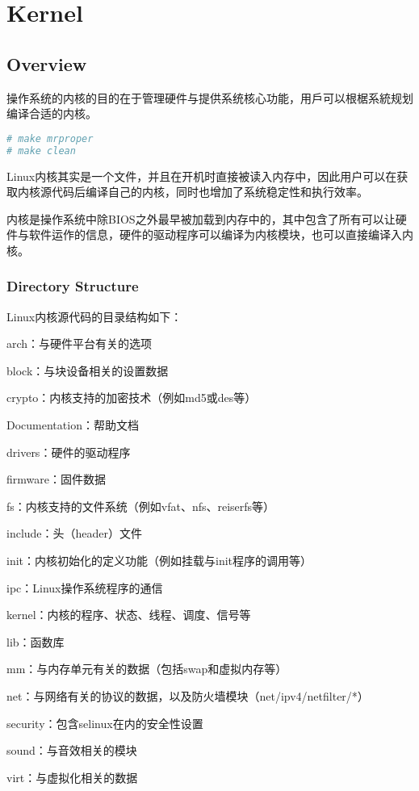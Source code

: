 \part{Kernel}

\chapter{Overview}

操作系统的内核的目的在于管理硬件与提供系统核心功能，用戶可以根椐系統规划编译合适的内核。

\begin{lstlisting}[language=bash]
# make mrproper
# make clean
\end{lstlisting}


Linux内核其实是一个文件，并且在开机时直接被读入内存中，因此用户可以在获取内核源代码后编译自己的内核，同时也增加了系统稳定性和执行效率。

内核是操作系统中除BIOS之外最早被加载到内存中的，其中包含了所有可以让硬件与软件运作的信息，硬件的驱动程序可以编译为内核模块，也可以直接编译入内核。


\section{Directory Structure}


Linux内核源代码的目录结构如下：

\begin{compactitem}
\item arch：与硬件平台有关的选项
\item block：与块设备相关的设置数据
\item crypto：内核支持的加密技术（例如md5或des等）
\item Documentation：帮助文档
\item drivers：硬件的驱动程序
\item firmware：固件数据
\item fs：内核支持的文件系统（例如vfat、nfs、reiserfs等）
\item include：头（header）文件
\item init：内核初始化的定义功能（例如挂载与init程序的调用等）
\item ipc：Linux操作系统程序的通信
\item kernel：内核的程序、状态、线程、调度、信号等
\item lib：函数库
\item mm：与内存单元有关的数据（包括swap和虚拟内存等）
\item net：与网络有关的协议的数据，以及防火墙模块（net/ipv4/netfilter/*）
\item security：包含selinux在内的安全性设置
\item sound：与音效相关的模块
\item virt：与虚拟化相关的数据
\end{compactitem}

